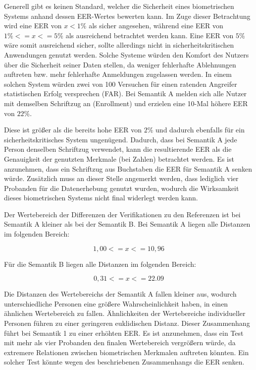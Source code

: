 \documentclass{article}
\begin{document}
Generell gibt es keinen Standard, welcher die Sicherheit eines biometrischen Systems anhand dessen
EER-Wertes bewerten kann. Im Zuge dieser Betrachtung wird eine EER von $x < 1\%$ als sicher angesehen,
während eine EER von $1\% <= x <= 5\%$ als ausreichend betrachtet werden kann. Eine EER von $5\%$
wäre somit ausreichend sicher, sollte allerdings nicht in sicherheitskritischen Anwendungen genutzt werden.
Solche Systeme würden den Komfort des Nutzers über die Sicherheit seiner Daten stellen, da weniger
fehlerhafte Ablehnungen auftreten bzw. mehr fehlerhafte Anmeldungen zugelassen werden. In einem solchen
System würden zwei von 100 Versuchen für einen ratenden Angreifer statistischen Erfolg versprechen (FAR).
Bei Semantik A melden sich alle Nutzer mit demselben Schriftzug an (Enrollment) und erzielen eine
10-Mal höhere EER von $22\%$.

Diese ist größer als die bereits hohe EER von $2\%$ und dadurch ebenfalls für ein sicherheitskritisches
System ungenügend. Dadurch, dass bei Semantik A jede Person denselben Schriftzug verwendet, kann die
resultierende EER als die Genauigkeit der genutzten Merkmale (bei Zahlen) betrachtet werden. Es ist
anzunehmen, dass ein Schriftzug aus Buchstaben die EER für Semantik A senken würde. Zusätzlich muss
an dieser Stelle angemerkt werden, dass lediglich vier Probanden für die Datenerhebung genutzt wurden,
wodurch die Wirksamkeit dieses biometrischen Systems nicht final widerlegt werden kann.

Der Wertebereich der Differenzen der Verifikationen zu den Referenzen ist bei Semantik A kleiner
als bei der Semantik B. Bei Semantik A liegen alle Distanzen im folgenden Bereich:

$$1,00 <= x <= 10,96$$

Für die Semantik B liegen alle Distanzen im folgenden Bereich:

$$0,31 <= x <= 22.09$$

Die Distanzen des Wertebereichs der Semantik A fallen kleiner aus, wodurch unterschiedliche Personen eine
größere Wahrscheinlichkeit haben, in einen ähnlichen Wertebereich zu fallen. Ähnlichkeiten der Wertebereiche
individueller Personen führen zu einer geringeren euklidischen Distanz. Dieser Zusammenhang führt bei
Semantik 1 zu einer erhöhten EER. Es ist anzunehmen, dass ein Test mit mehr als vier Probanden den
finalen Wertebereich vergrößern würde, da extremere Relationen zwischen biometrischen Merkmalen auftreten
könnten. Ein solcher Test könnte wegen des beschriebenen Zusammenhangs die EER senken.
\end{document}
